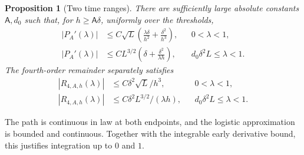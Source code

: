 \documentclass[11pt,letterpaper]{article}
\newif\ifshowrev
\newcommand{\rs}[1]{\ifshowrev{\color{revblue}#1}\else#1\fi}
\newcommand{\Ac}{\rs{\mathsf A}}
\newtheorem{proposition}{Proposition}
\theoremstyle{remark}
\begin{document}
\begin{proposition}[Two time ranges]\label{an:prop:derivative}
There are sufficiently large absolute constants \(\Ac,d_0\) such that,
for \(h\ge\Ac\delta\), uniformly over the thresholds,
\begin{align}
 |P_A'(\lambda)|&\le C\sqrt L\left(
 \frac{\lambda\delta}{h^2}+\frac{\delta^2}{h^3}\right),
 &&0<\lambda<1,\label{an:early}\\
 |P_A'(\lambda)|&\le CL^{3/2}\left(
 \delta+\frac{\delta^2}{\lambda h}\right),
 &&d_0\delta^2L\le\lambda<1.\label{an:late}
\end{align}
The fourth-order remainder separately satisfies
\begin{align}
 |R_{4,A,h}(\lambda)|&\le C\delta^2\sqrt L/h^3,
 &&0<\lambda<1,\label{eq:remainder-early}\\
 |R_{4,A,h}(\lambda)|&\le C\delta^2L^{3/2}/(\lambda h),
 &&d_0\delta^2L\le\lambda<1.\label{an:remainder}
\end{align}
\end{proposition}
The path is continuous in law at both endpoints, and the logistic approximation is
bounded and continuous. Together with the integrable early derivative
bound, this justifies integration up to \(0\) and \(1\).
\end{document}
